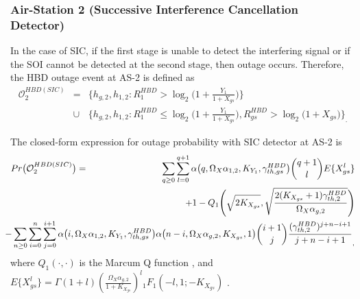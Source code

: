 \subsubsection{Air-Station 2 (Successive Interference Cancellation Detector)}

In the case of SIC, if the first stage is unable to detect the interfering signal or if the SOI cannot be detected at the second stage, then outage occurs. Therefore, the HBD outage event at AS-2 is defined as 
\begin{eqnarray}
\mathcal{O}_{2}^{HBD(SIC)} & = & \bigg\{h_{g,2}, h_{1,2} : R_{1}^{HBD} > \log_{2}\bigg(1+\frac{Y_{1}}{1+X_{gs}}\bigg) \bigg\} \nonumber\\
& \cup & \bigg\{h_{g,2}, h_{1,2} :  R_{1}^{HBD} \leq \log_{2}\bigg(1+\frac{Y_{1}}{1+X_{gs}}\bigg) , R_{gs}^{HBD} > \log_{2}\big(1+X_{gs}\big) \bigg\}_.
\end{eqnarray}

\begin{theorem}
The closed-form expression for outage probability with SIC detector at AS-2 is
\begin{eqnarray} \label{interference_management_HBD_ACS_P_out_as2_SIC}
Pr\big(\mathcal{O}_{2}^{HBD(SIC)}\big) & = & \sum_{q\geq0}\sum_{l=0}^{q+1} \alpha\big(q,\Omega_X\alpha_{1,2},K_{Y_{1}},\gamma_{th,gs}^{HBD}\big) \binom{q+1}{l} E\{X_{gs}^l\} \nonumber \\
 & & \hspace{-3.5cm} + 1 - Q_1\Bigg( \sqrt{2K_{X_{gs}}}, \sqrt{\frac{2(K_{X_{gs}}+1)\gamma_{th,2}^{HBD}}{\Omega_{X}\alpha_{g,2}}} \Bigg) \nonumber \\
 & & \hspace{-3.5cm} - \sum_{n\geq0}\sum_{i=0}^{n}\sum_{j=0}^{i+1} \alpha\big(i,\Omega_X\alpha_{1,2},K_{Y_{1}},\gamma_{th,gs}^{HBD}\big) \alpha\big(n-i,\Omega_X\alpha_{g,2},K_{X_{gs}},1\big)  \binom{i+1}{j}\frac{(\gamma_{th,2}^{HBD})^{j+n-i+1}}{j+n-i+1}_,
\end{eqnarray}
where $Q_1\left(\cdot,\cdot\right)$ is the Marcum Q function \cite{andras2011generalized}, \cite[Eq. (4.33)]{simon2005digital} and $E\{X_{gs}^l\}=\Gamma(1+l)\left(\frac{\Omega_{X}\alpha_{g,2}}{1+K_{X_{gs}}}\right)^{l} {}_1{F_1}(-l,1;-K_{X_{gs}})$ \cite[Table II]{rached2017unified}.
\end{theorem}

